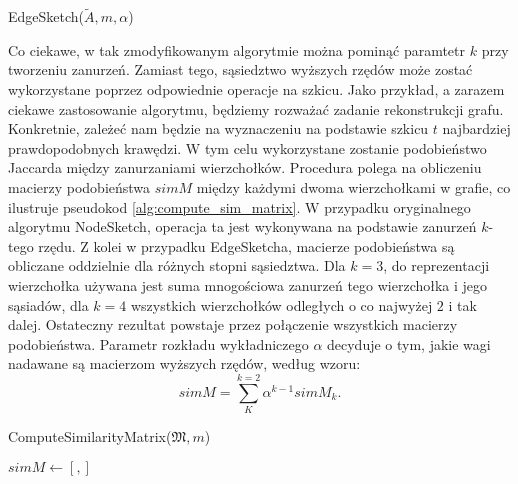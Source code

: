    \begin{algorithm}
        \caption{EdgeSketch($\tilde{A},m,\alpha$)}\label{alg:edge_sketch}
    \end{algorithm}

    Co ciekawe, w tak zmodyfikowanym algorytmie można pominąć paramtetr $k$ przy tworzeniu zanurzeń. Zamiast tego, sąsiedztwo wyższych rzędów może zostać wykorzystane poprzez odpowiednie operacje na szkicu. Jako przykład, a zarazem ciekawe zastosowanie algorytmu, będziemy rozważać zadanie rekonstrukcji grafu. Konkretnie, zależeć nam będzie na wyznaczeniu na podstawie szkicu $t$ najbardziej prawdopodobnych krawędzi. W tym celu wykorzystane zostanie podobieństwo Jaccarda między zanurzaniami wierzchołków. Procedura polega na obliczeniu macierzy podobieństwa $simM$ między każdymi dwoma wierzchołkami w grafie, co ilustruje pseudokod \ref{alg:compute_sim_matrix}. W przypadku oryginalnego algorytmu NodeSketch, operacja ta jest wykonywana na podstawie zanurzeń $k$-tego rzędu. Z kolei w przypadku EdgeSketcha, macierze podobieństwa są obliczane oddzielnie dla różnych stopni sąsiedztwa. Dla $k = 3$, do reprezentacji wierzchołka używana jest suma mnogościowa zanurzeń tego wierzchołka i jego sąsiadów, dla $k = 4$ wszystkich wierzchołków odległych o co najwyżej $2$ i tak dalej. Ostateczny rezultat powstaje przez połączenie wszystkich macierzy podobieństwa. Parametr rozkładu wykładniczego $\alpha$ decyduje o tym, jakie wagi nadawane są macierzom wyższych rzędów, według wzoru:
    \begin{equation}  \label{eq:sim_matrix}  
        simM = \sum\limits_{K}^{k = 2} \alpha^{k-1} simM_{k}.
    \end{equation}
    
    \begin{algorithm}
        \caption{ComputeSimilarityMatrix($\mathfrak{M}, m$)}\label{alg:compute_sim_matrix}
        $simM \gets [,]$ \;
    \end{algorithm}
